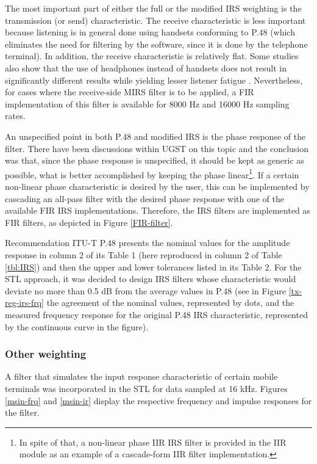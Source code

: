 \newpage
The most important part of either the full or the modified IRS
weighting is the transmission (or send) characteristic. The receive
characteristic is less important because listening is in general
done using handsets conforming to P.48 (which eliminates the need
for filtering by the software, since it is done by the telephone
terminal). In addition, the receive characteristic is relatively
flat. Some studies also show that the use of headphones instead of
handsets does not result in significantly different results while
yielding lesser listener fatigue \cite{HeadphoneACR,HeadphoneDCR}.
Nevertheless, for cases where the receive-side MIRS filter is to be
applied, a FIR implementation of this filter is available for 8000
Hz and 16000 Hz sampling rates.

An unspecified point in both P.48 and modified IRS is the phase
response of the filter. There have been discussions within UGST on
this topic and the 
conclusion was that, since the phase response is unspecified, it
should be kept as generic as possible, what is better accomplished by
keeping the phase linear\footnote{\SF In spite of that, a non-linear
phase IIR IRS filter is provided in the IIR module as an example of a
cascade-form IIR filter implementation.}. If a certain non-linear
phase characteristic is desired by the user, this can be implemented
by cascading an all-pass filter with the desired phase response with
one of the available FIR IRS implementations. Therefore, the IRS
filters are implemented as FIR filters, as depicted in Figure
\ref{FIR-filter}.

Recommendation ITU-T P.48 presents the nominal values for the
amplitude response in column 2 of its Table 1 (here reproduced in
column 2 of Table \ref{tbl:IRS}) and then the upper and lower
tolerances listed in its Table 2. For the STL approach, it was decided
to design IRS filters whose characteristic would deviate no more than
0.5 dB from the average values in P.48 (see in Figure
\ref{tx-reg-irs-frq} the agreement of the nominal values, represented by
dots, and the measured frequency response for the original P.48 IRS
characteristic, represented by the continuous curve in the figure).

\subsubsection{Other weighting}

A filter that simulates the input response characteristic of certain
mobile terminals was incorporated in the STL for data sampled at 16
kHz. Figures \ref{msin-frq} and \ref{msin-ir} display the respective
frequency and impulse responses for the filter.

